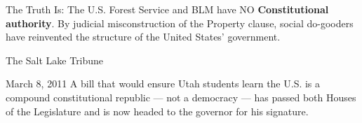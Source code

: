 \begin{frame}{The Truth Is:}
    \large
    The U.S. Forest Service and BLM have NO \textbf{Constitutional authority}.
    By judicial misconstruction of the Property clause, social do-gooders have
    reinvented the structure of the United States' government.
\end{frame}

\begin{frame}{The Salt Lake Tribune}
    \begin{block}{March 8, 2011}
    A bill that would ensure Utah students learn the U.S. is a compound constitutional republic --- not a democracy --- has passed both
    Houses of the Legislature and is now headed to the governor for his signature.
    \end{block}
\end{frame}
%

